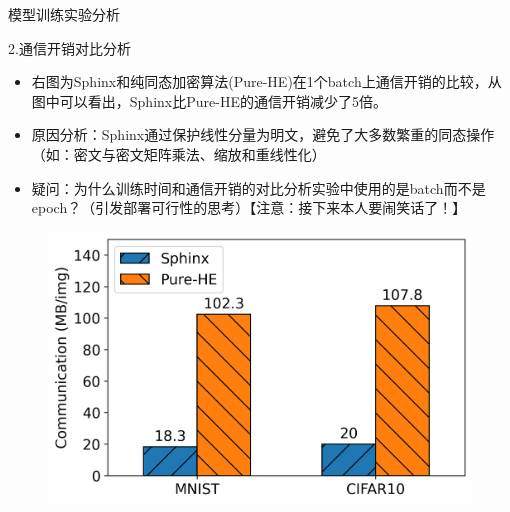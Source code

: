 \documentclass{beamer}
\begin{document}
\begin{frame}{模型训练实验分析}
    \begin{minipage}[l]{0.7\linewidth}
    \begin{exampleblock}{2.通信开销对比分析}
        	\begin{itemize}
    		\item {\footnotesize 右图为Sphinx和纯同态加密算法(Pure-HE)在1个batch上通信开销的比较，从图中可以看出，Sphinx比Pure-HE的通信开销减少了5倍。}
    		\item {\footnotesize 原因分析：Sphinx通过保护线性分量为明文，避免了大多数繁重的同态操作（如：密文与密文矩阵乘法、缩放和重线性化）}
    		\item {\footnotesize \color{blue} 疑问：为什么训练时间和通信开销的对比分析实验中使用的是batch而不是epoch？（引发部署可行性的思考）【注意：接下来本人要闹笑话了！】}
    	\end{itemize}
    \end{exampleblock}
   \end{minipage}
    \begin{minipage}{0.2\linewidth}
        \begin{figure}[h]
            \centering
             \hspace{2cm}
            \includegraphics[height=.3\textheight]{pic/fig7.png}
        \end{figure} 
    \end{minipage}
\end{frame}
\end{document}
